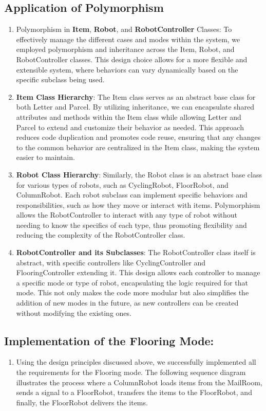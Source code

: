 \documentclass[12pt]{article}
\begin{document}
\subsection{Application of Polymorphism}
\begin{enumerate}
    \item Polymorphism in \textbf{Item}, \textbf{Robot}, and \textbf{RobotController} Classes: To effectively manage the different cases and modes within the system, we employed polymorphism and inheritance across the Item, Robot, and RobotController classes. This design choice allows for a more flexible and extensible system, where behaviors can vary dynamically based on the specific subclass being used.
    \item \textbf{Item Class Hierarchy}: The Item class serves as an abstract base class for both Letter and Parcel. By utilizing inheritance, we can encapsulate shared attributes and methods within the Item class while allowing Letter and Parcel to extend and customize their behavior as needed. This approach reduces code duplication and promotes code reuse, ensuring that any changes to the common behavior are centralized in the Item class, making the system easier to maintain.
    \item \textbf{Robot Class Hierarchy}: Similarly, the Robot class is an abstract base class for various types of robots, such as CyclingRobot, FloorRobot, and ColumnRobot. Each robot subclass can implement specific behaviors and responsibilities, such as how they move or interact with items. Polymorphism allows the RobotController to interact with any type of robot without needing to know the specifics of each type, thus promoting flexibility and reducing the complexity of the RobotController class.
    \item \textbf{RobotController and its Subclasses}: The RobotController class itself is abstract, with specific controllers like CyclingController and FlooringController extending it. This design allows each controller to manage a specific mode or type of robot, encapsulating the logic required for that mode. This not only makes the code more modular but also simplifies the addition of new modes in the future, as new controllers can be created without modifying the existing ones.
\end{enumerate}

\subsection{Implementation of the Flooring Mode:}
\begin{enumerate}
    \item Using the design principles discussed above, we successfully implemented all the requirements for the Flooring mode. The following sequence diagram illustrates the process where a ColumnRobot loads items from the MailRoom, sends a signal to a FloorRobot, transfers the items to the FloorRobot, and finally, the FloorRobot delivers the items.
\end{enumerate}
\end{document}
